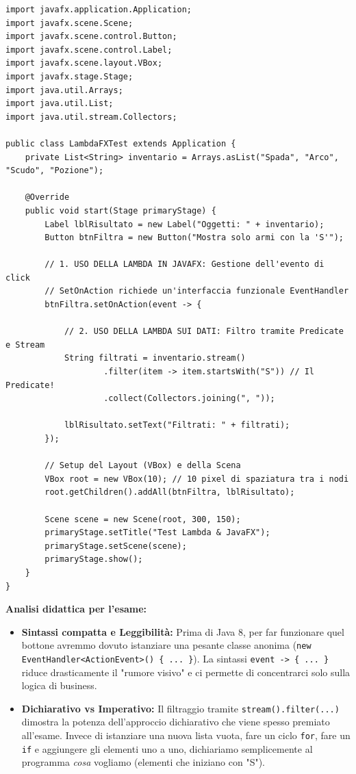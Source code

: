 \documentclass[12pt, a4paper]{article}
\begin{document}
\begin{verbatim}
import javafx.application.Application;
import javafx.scene.Scene;
import javafx.scene.control.Button;
import javafx.scene.control.Label;
import javafx.scene.layout.VBox;
import javafx.stage.Stage;
import java.util.Arrays;
import java.util.List;
import java.util.stream.Collectors;

public class LambdaFXTest extends Application {
    private List<String> inventario = Arrays.asList("Spada", "Arco", "Scudo", "Pozione");

    @Override
    public void start(Stage primaryStage) {
        Label lblRisultato = new Label("Oggetti: " + inventario);
        Button btnFiltra = new Button("Mostra solo armi con la 'S'");

        // 1. USO DELLA LAMBDA IN JAVAFX: Gestione dell'evento di click
        // SetOnAction richiede un'interfaccia funzionale EventHandler
        btnFiltra.setOnAction(event -> {
            
            // 2. USO DELLA LAMBDA SUI DATI: Filtro tramite Predicate e Stream
            String filtrati = inventario.stream()
                    .filter(item -> item.startsWith("S")) // Il Predicate!
                    .collect(Collectors.joining(", "));
            
            lblRisultato.setText("Filtrati: " + filtrati);
        });

        // Setup del Layout (VBox) e della Scena
        VBox root = new VBox(10); // 10 pixel di spaziatura tra i nodi
        root.getChildren().addAll(btnFiltra, lblRisultato);

        Scene scene = new Scene(root, 300, 150);
        primaryStage.setTitle("Test Lambda & JavaFX");
        primaryStage.setScene(scene);
        primaryStage.show();
    }
}
\end{verbatim}

\textbf{Analisi didattica per l'esame:}
\begin{itemize}
    \item \textbf{Sintassi compatta e Leggibilità:} Prima di Java 8, per far funzionare quel bottone avremmo dovuto istanziare una pesante classe anonima (\texttt{new EventHandler<ActionEvent>() \{ ... \}}). La sintassi \texttt{event -> \{ ... \}} riduce drasticamente il "rumore visivo" e ci permette di concentrarci solo sulla logica di business.
    \item \textbf{Dichiarativo vs Imperativo:} Il filtraggio tramite \texttt{stream().filter(...)} dimostra la potenza dell'approccio dichiarativo che viene spesso premiato all'esame. Invece di istanziare una nuova lista vuota, fare un ciclo \texttt{for}, fare un \texttt{if} e aggiungere gli elementi uno a uno, dichiariamo semplicemente al programma \textit{cosa} vogliamo (elementi che iniziano con "S").
\end{itemize}
\end{document}
